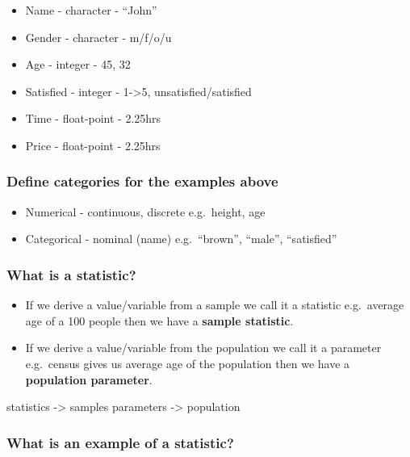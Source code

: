 \documentclass[
]{article}
\providecommand{\tightlist}{%
  \setlength{\itemsep}{0pt}\setlength{\parskip}{0pt}}
\begin{document}
\begin{itemize}
\tightlist
\item
  Name - character - ``John''
\item
  Gender - character - m/f/o/u
\item
  Age - integer - 45, 32
\item
  Satisfied - integer - 1-\textgreater5, unsatisfied/satisfied
\item
  Time - float-point - 2.25hrs
\item
  Price - float-point - 2.25hrs
\end{itemize}

\hypertarget{define-categories-for-the-examples-above}{%
\subsubsection{Define categories for the examples
above}\label{define-categories-for-the-examples-above}}

\begin{itemize}
\tightlist
\item
  Numerical - continuous, discrete e.g.~height, age
\item
  Categorical - nominal (name) e.g.~``brown'', ``male'', ``satisfied''
\end{itemize}

\hypertarget{what-is-a-statistic}{%
\subsubsection{What is a statistic?}\label{what-is-a-statistic}}

\begin{itemize}
\item
  If we derive a value/variable from a sample we call it a statistic
  e.g.~average age of a 100 people then we have a \textbf{sample
  statistic}.
\item
  If we derive a value/variable from the population we call it a
  parameter e.g.~census gives us average age of the population then we
  have a \textbf{population parameter}.
\end{itemize}

statistics -\textgreater{} samples parameters -\textgreater{} population

\hypertarget{what-is-an-example-of-a-statistic}{%
\subsubsection{What is an example of a
statistic?}\label{what-is-an-example-of-a-statistic}}
\end{document}
